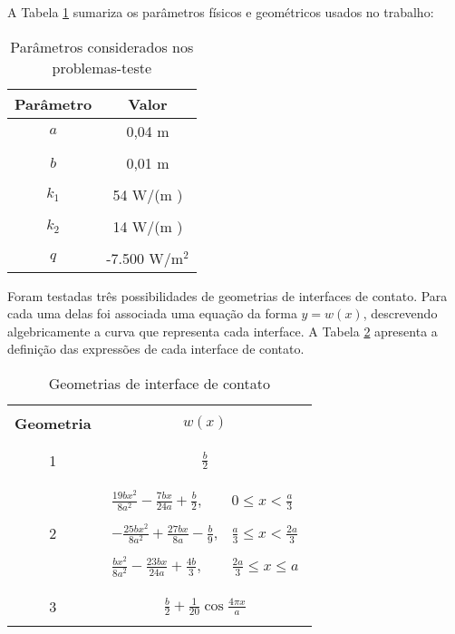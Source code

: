 A Tabela \ref{tabela_params} sumariza os parâmetros físicos e geométricos usados no trabalho:
\vspace{10mm}
\begin{table}[H]
	\centering
	\caption{Parâmetros considerados nos problemas-teste}
	\begin{tabular}{@{}cc@{}}
		\toprule
		\textbf{Parâmetro} & \textbf{Valor}    \\ \midrule
		$a$       & 0,04 m   \\ \\
		$b$       & 0,01 m     \\ \\
		$k_1$     & 54 W/(m \celsius)  \\ \\ 
		$k_2$     & 14 W/(m \celsius) \\ \\
		$q$       & -7.500 W/$\text{m}^2$ \\ \bottomrule
	\end{tabular}		
\label{tabela_params}
\end{table}

Foram testadas três possibilidades de geometrias de interfaces de contato. Para cada uma delas foi associada uma equação da forma $y = w(x)$, descrevendo algebricamente a curva que representa cada interface. A Tabela \ref{tabela_interfaces} apresenta a definição das expressões de cada interface de contato.
\begin{table}[H]
	\centering
	\caption{Geometrias de interface de contato}
		\begin{tabular}{c|c}
			\hline \\
			\textbf{Geometria} & $w(x)$    \\ \\ \hline \\
			1       & $\displaystyle\frac{b}{2}$   \\ \\ \hline \\
			2       & $\begin{array}{ll}
			\displaystyle\frac{19bx^2}{8a^2}-\frac{7bx}{24a}+\frac{b}{2}, & \displaystyle 0 \le x < \frac{a}{3} \\ \\
			\displaystyle -\frac{25bx^2}{8a^2}+\frac{27bx}{8a}-\frac{b}{9}, & \displaystyle \frac{a}{3} \le x < \frac{2a}{3} \\ \\
			\displaystyle \frac{bx^2}{8a^2}-\frac{23bx}{24a}+\frac{4b}{3}, & \displaystyle \frac{2a}{3} \le x \le a
			\end{array}$     \\ \\ \hline \\
			3       & $\displaystyle \frac{b}{2} + \frac{1}{20} \cos\frac{4 \pi  x}{a}$ \\ \\ \hline
		\end{tabular}			
	\label{tabela_interfaces}
\end{table}

